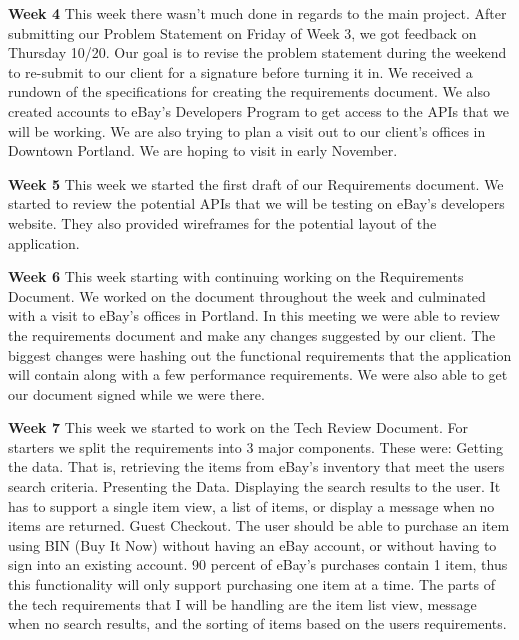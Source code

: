 \documentclass[journal,compsoc, 10pt, draftclsnofoot, onecolumn]{IEEEtran}
\begin{document}
\textbf{Week 4}\newline
This week there wasn't much done in regards to the main project. After submitting 
our Problem Statement on Friday of Week 3, we got feedback on Thursday 10/20. 
Our goal is to revise the problem statement during the weekend to re-submit to 
our client for a signature before turning it in. We received a rundown of the 
specifications for creating the requirements document. We also created accounts 
to eBay's Developers Program to get access to the APIs that we will be working. 
We are also trying to plan a visit out to our client's offices in Downtown Portland. 
We are hoping to visit in early November.\newline

\textbf{Week 5}\newline
This week we started the first draft of our Requirements document. We started to 
review the potential APIs that we will be testing on eBay's developers website. 
They also provided wireframes for the potential layout of the application.\newline

\textbf{Week 6}\newline
This week starting with continuing working on the Requirements Document. 
We worked on the document throughout the week and culminated with a visit to eBay's 
offices in Portland. In this meeting we were able to review the requirements 
document and make any changes suggested by our client. The biggest changes 
were hashing out the functional requirements that the application will contain 
along with a few performance requirements. We were also able to get our document 
signed while we were there.\newline

\textbf{Week 7}\newline
This week we started to work on the Tech Review Document. For starters we split 
the requirements into 3 major components. These were:\newline
Getting the data. That is, retrieving the items from eBay's inventory that meet 
the users search criteria.\newline
Presenting the Data. Displaying the search results to the user. It has to support a 
single item view, a list of items, or display a message when no items are returned.\newline
Guest Checkout. The user should be able to purchase an item using BIN
 (Buy It Now) without having an eBay account, or without having to sign 
 into an existing account. 90 percent of eBay's purchases contain 1 item,
  thus this functionality will only support purchasing one item at a time.\newline
The parts of the tech requirements that I will be handling are the item list
 view, message when no search results, and the sorting of items based on 
 the users requirements.\newline
\end{document}
